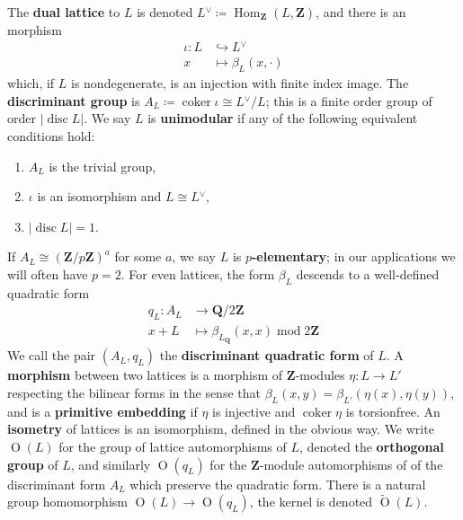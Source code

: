 \documentclass{amsart}
\renewcommand{\tilde}{\widetilde}
\begin{document}
\begin{remark}

The \textbf{dual lattice} to \(L\) is denoted \(L {}^{ \vee }\coloneqq{ \operatorname{Hom} }_{\mathbf{Z}}(L, {\mathbf{Z}})\), and there is an morphism \[\begin{aligned}
\iota: L &\hookrightarrow L {}^{ \vee }\\
x &\mapsto \beta_L(x, \cdot)
\end{aligned}\] which, if \(L\) is nondegenerate, is an injection with finite index image. The \textbf{discriminant group} is \(A_L \coloneqq\operatorname{coker}\iota \cong L {}^{ \vee }/L\); this is a finite order group of order \({\left\lvert {\operatorname{disc} L} \right\rvert}\). We say \(L\) is \textbf{unimodular} if any of the following equivalent conditions hold:

\begin{enumerate}
\def\labelenumi{\arabic{enumi}.}
\item
  \(A_L\) is the trivial group,
\item
  \(\iota\) is an isomorphism and \(L\cong L {}^{ \vee }\),
\item
  \({\left\lvert { \operatorname{disc} L} \right\rvert} = 1\).
\end{enumerate}

If \(A_L \cong ({\mathbf{Z}}/p{\mathbf{Z}})^a\) for some \(a\), we say \(L\) is \textbf{\(p\)-elementary}; in our applications we will often have \(p=2\). For even lattices, the form \(\beta_L\) descends to a well-defined quadratic form \[\begin{aligned}
q_L: A_L &\to {\mathbf{Q}}/2{\mathbf{Z}}\\
x + L &\mapsto \beta_{L_{\mathbf{Q}}}(x, x) \operatorname{mod}2{\mathbf{Z}}
\end{aligned}\] We call the pair \((A_L, q_L)\) the \textbf{discriminant quadratic form} of \(L\). A \textbf{morphism} between two lattices is a morphism of \({\mathbf{Z}}\)-modules \(\eta: L\to L'\) respecting the bilinear forms in the sense that \(\beta_L(x, y) = \beta_{L'}(\eta(x), \eta(y))\), and is a \textbf{primitive embedding} if \(\eta\) is injective and \(\operatorname{coker}\eta\) is torsionfree. An \textbf{isometry} of lattices is an isomorphism, defined in the obvious way. We write \({\operatorname{O}}(L)\) for the group of lattice automorphisms of \(L\), denoted the \textbf{orthogonal group} of \(L\), and similarly \({\operatorname{O}}(q_L)\) for the \({\mathbf{Z}}\)-module automorphisms of of the discriminant form \(A_L\) which preserve the quadratic form. There is a natural group homomorphism \({\operatorname{O}}(L)\to{\operatorname{O}}(q_L)\), the kernel is denoted \(\tilde {\operatorname{O}}(L)\).

\end{remark}
\end{document}
